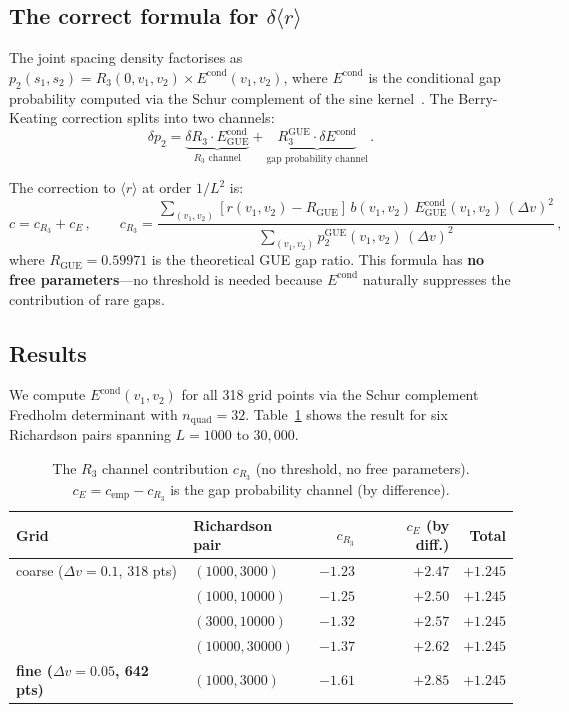 \documentclass[11pt]{article}
\begin{document}
\subsection{The correct formula for $\delta\langle r\rangle$}

The joint spacing density factorises as
$p_2(s_1, s_2) = R_3(0, v_1, v_2) \times E^{\mathrm{cond}}(v_1, v_2)$,
where $E^{\mathrm{cond}}$ is the conditional gap probability computed via
the Schur complement of the sine kernel~\cite{bornemann2010}.
The Berry-Keating correction splits into two channels:
\begin{equation}
\delta p_2 = \underbrace{\delta R_3 \cdot E^{\mathrm{cond}}_{\mathrm{GUE}}}_{\text{$R_3$ channel}}
+ \underbrace{R_3^{\mathrm{GUE}} \cdot \delta E^{\mathrm{cond}}}_{\text{gap probability channel}}\,.
\label{eq:two_channels}
\end{equation}

The correction to $\langle r\rangle$ at order $1/L^2$ is:
\begin{equation}
c = c_{R_3} + c_E\,, \qquad
c_{R_3} = \frac{\displaystyle\sum_{(v_1,v_2)} [r(v_1,v_2) - R_{\mathrm{GUE}}]\,
b(v_1,v_2)\, E^{\mathrm{cond}}_{\mathrm{GUE}}(v_1,v_2)\, (\Delta v)^2}
{\displaystyle\sum_{(v_1,v_2)} p_2^{\mathrm{GUE}}(v_1,v_2)\, (\Delta v)^2}\,,
\label{eq:c_R3}
\end{equation}
where $R_{\mathrm{GUE}} = 0.59971$ is the theoretical GUE gap ratio.
This formula has \textbf{no free parameters}---no threshold is needed because
$E^{\mathrm{cond}}$ naturally suppresses the contribution of rare gaps.

\subsection{Results}

We compute $E^{\mathrm{cond}}(v_1, v_2)$ for all 318 grid points via
the Schur complement Fredholm determinant with $n_{\mathrm{quad}} = 32$.
Table~\ref{tab:channels} shows the result for six Richardson pairs spanning
$L = 1000$ to $30{,}000$.

\begin{table}[ht]
\centering
\caption{The $R_3$ channel contribution $c_{R_3}$ (no threshold, no free parameters).
$c_E = c_{\mathrm{emp}} - c_{R_3}$ is the gap probability channel (by difference).}
\label{tab:channels}
\begin{tabular}{llrrr}
\toprule
Grid & Richardson pair & $c_{R_3}$ & $c_E$ (by diff.) & Total \\
\midrule
coarse ($\Delta v = 0.1$, 318 pts) & $(1000, 3000)$ & $-1.23$ & $+2.47$ & $+1.245$ \\
 & $(1000, 10000)$ & $-1.25$ & $+2.50$ & $+1.245$ \\
 & $(3000, 10000)$ & $-1.32$ & $+2.57$ & $+1.245$ \\
 & $(10000, 30000)$ & $-1.37$ & $+2.62$ & $+1.245$ \\
\midrule
\textbf{fine ($\Delta v = 0.05$, 642 pts)} & \textbf{$(1000, 3000)$} & $\mathbf{-1.61}$ & $\mathbf{+2.85}$ & $\mathbf{+1.245}$ \\
\bottomrule
\end{tabular}
\end{table}
\end{document}

